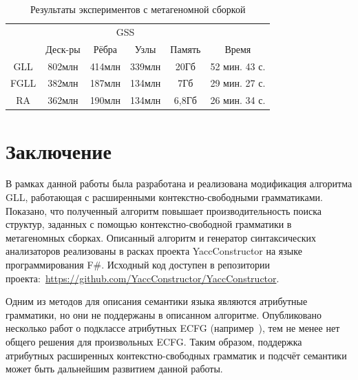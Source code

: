 \begin{table}
	\begin{center}
		\begin{tabular}{ | c | c | c | c | c | c |}
			\hline
			& &\multicolumn{2}{c|}{GSS} & & \\
			\cline{3-4}
			& Деск-ры & Рёбра   & Узлы   & Память& Время   \\ \hline
			GLL               &  802млн &  414млн & 339млн  & 20Гб & 52 мин. 43 с.  \\ \hline
			FGLL        &  382млн &  187млн & 134млн & 7Гб & 29 мин. 27 с.  \\ \hline
			RA                &  362млн &  190млн & 134млн & 6,8Гб & 26 мин. 34 с.  \\ \hline %
		\end{tabular}
		\caption{Результаты экспериментов с метагеномной сборкой}
		\label{expTable1}
	\end{center}
\end{table}

\section*{Заключение}
В рамках данной работы была разработана и реализована модификация алгоритма GLL,
работающая с расширенными контекстно-свободными грамматиками. Показано, что полученный
алгоритм повышает производительность поиска структур, заданных с помощью контекстно-свободной
грамматики в метагеномных сборках. Описанный алгоритм и генератор синтаксических анализаторов реализованы
в расках проекта YaccConstructor на языке программирования F\#.
Исходный код доступен в репозитории проекта:~\url{https://github.com/YaccConstructor/YaccConstructor}.

Одним из методов для описания семантики языка являются атрибутные грамматики, но они не поддержаны в описанном алгоритме.
Опубликовано несколько работ о подклассе атрибутных ECFG (например~\cite{AttributedELL}), тем не менее нет общего решения для произвольных ECFG.
Таким образом, поддержка атрибутных расширенных контекстно-свободных грамматик и подсчёт семантики может быть дальнейшим развитием данной работы.
%


